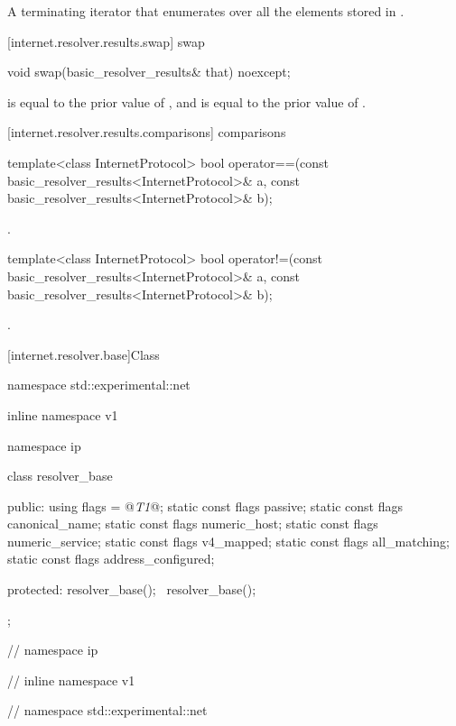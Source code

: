 \begin{itemdescr}
\pnum
\returns A terminating iterator that enumerates over all the  elements stored in .
\end{itemdescr}



[internet.resolver.results.swap]{ swap}

\begin{itemdecl}
void swap(basic_resolver_results& that) noexcept;
\end{itemdecl}

\begin{itemdescr}
\pnum
\postconditions {} is equal to the prior value of , and  is equal to the prior value of .
\end{itemdescr}



[internet.resolver.results.comparisons]{ comparisons}

\begin{itemdecl}
template<class InternetProtocol>
  bool operator==(const basic_resolver_results<InternetProtocol>& a,
                  const basic_resolver_results<InternetProtocol>& b);
\end{itemdecl}

\begin{itemdescr}
\pnum
\returns {}.
\end{itemdescr}

\begin{itemdecl}
template<class InternetProtocol>
  bool operator!=(const basic_resolver_results<InternetProtocol>& a,
                  const basic_resolver_results<InternetProtocol>& b);
\end{itemdecl}

\begin{itemdescr}
\pnum
\returns {}.
\end{itemdescr}




%
[internet.resolver.base]{Class }

%
\begin{codeblock}
namespace std::experimental::net {
inline namespace v1 {
namespace ip {

  class resolver_base
  {
  public:
    using flags = @\textit{T1}@;
    static const flags passive;
    static const flags canonical_name;
    static const flags numeric_host;
    static const flags numeric_service;
    static const flags v4_mapped;
    static const flags all_matching;
    static const flags address_configured;

  protected:
    resolver_base();
    ~resolver_base();
  };

} // namespace ip
} // inline namespace v1
} // namespace std::experimental::net
\end{codeblock}

